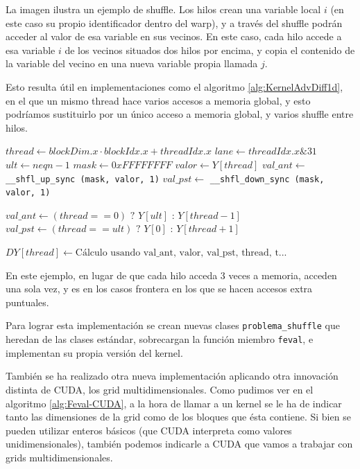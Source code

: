 La imagen ilustra un ejemplo de shuffle. Los hilos crean una variable local $i$ (en este caso su propio identificador dentro del warp), y a través del shuffle podrán acceder al valor de esa variable en sus vecinos. En este caso, cada hilo accede a esa variable $i$ de los vecinos situados dos hilos por encima, y copia el contenido de la variable del vecino en una nueva variable propia llamada $j$. 

Esto resulta útil en implementaciones como el algoritmo \ref{alg:KernelAdvDiff1d}, en el que un mismo thread hace varios accesos a memoria global, y esto podríamos sustituirlo por un único acceso a memoria global, y varios shuffle entre hilos.

\begin{algorithm}[H]
	\begin{algorithmic}
		\State $thread \gets blockDim.x \cdot blockIdx.x + threadIdx.x$  
		\State $lane \gets threadIdx.x \& 31$ 
		\State $ult \gets neqn - 1$
			\State $mask \gets 0xFFFFFFFF$
			\State $valor \gets Y[thread]$ 
			\State $val\_ant \gets$ \verb|__shfl_up_sync (mask, valor, 1)| 
			\State $val\_pst \gets$ \verb|__shfl_down_sync (mask, valor, 1)|
			
			 
				\State $val\_ant \gets (thread==0)\text{ ? } Y[ult] \text{ : } Y[thread-1]$ 
			\EndIf
				\State $val\_pst \gets (thread==ult)\text{ ? } Y[0] \text{ : } Y[thread+1]$ 
			\EndIf
			
			\State $ DY[thread] \gets \text{Cálculo usando val\_ant, valor, val\_pst, thread, t...} $
		\EndIf
	\end{algorithmic}
	\caption{Kernel \texttt{feval} de AdvDiff1D con shuffle de hilos}
	\label{alg:ShuffleAdvDiff1d}
\end{algorithm}

En este ejemplo, en lugar de que cada hilo acceda 3 veces a memoria, acceden una sola vez, y es en los casos frontera en los que se hacen accesos extra puntuales.

Para lograr esta implementación se crean nuevas clases \texttt{problema\_shu\-ffle} que heredan de las clases estándar, sobrecargan la función miembro \texttt{feval}, e implementan su propia versión del kernel.

También se ha realizado otra nueva implementación aplicando otra innovación distinta de CUDA, los grid multidimensionales. Como pudimos ver en el algoritmo \ref{alg:Feval-CUDA}, a la hora de llamar a un kernel se le ha de indicar tanto las dimensiones de la grid como de los bloques que ésta contiene. Si bien se pueden utilizar enteros básicos (que CUDA interpreta como valores unidimensionales), también podemos indicarle a CUDA que vamos a trabajar con grids multidimensionales.

